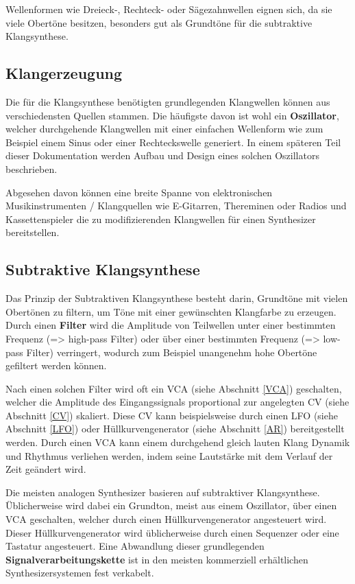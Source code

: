 Wellenformen wie Dreieck-, Rechteck- oder Sägezahnwellen eignen sich, da sie viele Obertöne besitzen, besonders gut als Grundtöne für die subtraktive Klangsynthese.

\subsection{Klangerzeugung}
\label{sec:org9aff11d}
Die für die Klangsynthese benötigten grundlegenden Klangwellen können aus verschiedensten Quellen stammen. Die häufigste davon ist wohl ein \textbf{Oszillator}, welcher durchgehende Klangwellen mit einer einfachen Wellenform wie zum Beispiel einem Sinus oder einer Rechteckswelle generiert. In einem späteren Teil dieser Dokumentation werden Aufbau und Design eines solchen Oszillators beschrieben.

Abgesehen davon können eine breite Spanne von elektronischen Musikinstrumenten / Klangquellen wie E-Gitarren, Thereminen oder Radios und Kassettenspieler die zu modifizierenden Klangwellen für einen Synthesizer bereitstellen.

\subsection{Subtraktive Klangsynthese}
\label{sec:org9131df3}
Das Prinzip der Subtraktiven Klangsynthese besteht darin, Grundtöne mit vielen Obertönen zu filtern, um Töne mit einer gewünschten Klangfarbe zu erzeugen. Durch einen \textbf{Filter} wird die Amplitude von Teilwellen unter einer bestimmten Frequenz (=> high-pass Filter) oder über einer bestimmten Frequenz (=> low-pass Filter) verringert, wodurch zum Beispiel unangenehm hohe Obertöne gefiltert werden können.

Nach einen solchen Filter wird oft ein \ac{VCA} (siehe Abschnitt \ref{VCA}) geschalten, welcher die Amplitude des Eingangssignals proportional zur angelegten \ac{CV} (siehe Abschnitt \ref{CV}) skaliert. Diese \acl{CV} kann beispielsweise durch einen \ac{LFO} (siehe Abschnitt \ref{LFO}) oder Hüllkurvengenerator (siehe Abschnitt \ref{AR}) bereitgestellt werden. Durch einen \ac{VCA} kann einem durchgehend gleich lauten Klang Dynamik und Rhythmus verliehen werden, indem seine Lautstärke mit dem Verlauf der Zeit geändert wird.

Die meisten analogen Synthesizer basieren auf subtraktiver Klangsynthese. Üblicherweise wird dabei ein Grundton, meist aus einem Oszillator, über einen \ac{VCA} geschalten, welcher durch einen Hüllkurvengenerator angesteuert wird. Dieser Hüllkurvengenerator wird üblicherweise durch einen Sequenzer oder eine Tastatur angesteuert. Eine Abwandlung dieser grundlegenden \textbf{Signalverarbeitungskette} ist in den meisten kommerziell erhältlichen Synthesizersystemen fest verkabelt.


